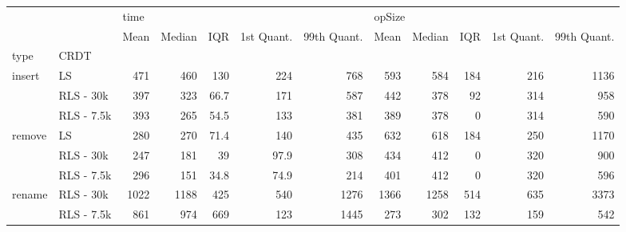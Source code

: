 \begin{tabular}{llrrrrrrrrrr}
\toprule
       &            & \multicolumn{5}{l}{time} & \multicolumn{5}{l}{opSize} \\
       &            & Mean & Median &  IQR & 1st Quant. & 99th Quant. &   Mean & Median & IQR & 1st Quant. & 99th Quant. \\
type & CRDT &      &        &      &            &             &        &        &     &            &             \\
\midrule
insert & LS &  471 &    460 &  130 &        224 &         768 &    593 &    584 & 184 &        216 &        1136 \\
       & RLS - 30k &  397 &    323 & 66.7 &        171 &         587 &    442 &    378 &  92 &        314 &         958 \\
       & RLS - 7.5k &  393 &    265 & 54.5 &        133 &         381 &    389 &    378 &   0 &        314 &         590 \\
remove & LS &  280 &    270 & 71.4 &        140 &         435 &    632 &    618 & 184 &        250 &        1170 \\
       & RLS - 30k &  247 &    181 &   39 &       97.9 &         308 &    434 &    412 &   0 &        320 &         900 \\
       & RLS - 7.5k &  296 &    151 & 34.8 &       74.9 &         214 &    401 &    412 &   0 &        320 &         596 \\
rename & RLS - 30k & 1022 &   1188 &  425 &        540 &        1276 &   1366 &   1258 & 514 &        635 &        3373 \\
       & RLS - 7.5k &  861 &    974 &  669 &        123 &        1445 &    273 &    302 & 132 &        159 &         542 \\
\bottomrule
\end{tabular}
